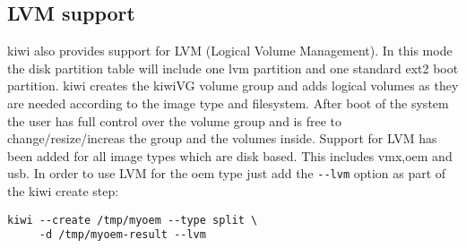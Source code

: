 \subsection{LVM support}

kiwi also provides support for LVM (Logical Volume Management). In this
mode the disk partition table will include one lvm partition and one
standard ext2 boot partition. kiwi creates the kiwiVG volume group and
adds logical volumes as they are needed according to the image type and
filesystem. After boot of the system the user has full control over the
volume group and is free to change/resize/increas the group and the
volumes inside. Support for LVM has been added for all image types which
are disk based. This includes vmx,oem and usb. In order to use LVM for the
oem type just add the \verb+--lvm+ option as part of the kiwi create step:

\begin{Command}{12cm}
\begin{verbatim}
kiwi --create /tmp/myoem --type split \
     -d /tmp/myoem-result --lvm
\end{verbatim}
\end{Command}
